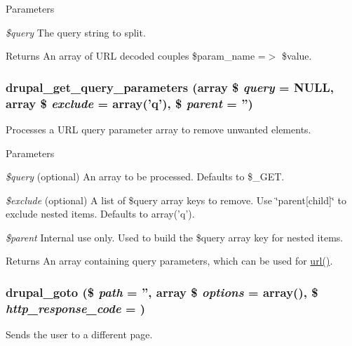 \begin{DoxyParams}{Parameters}
\item[{\em \$query}]The query string to split.\end{DoxyParams}
\begin{DoxyReturn}{Returns}
An array of URL decoded couples \$param\_\-name =$>$ \$value. 
\end{DoxyReturn}
\hypertarget{group__http__handling_ga2e632373cf469e513c0b6b7095f0e4dd}{
\subsubsection[{drupal\_\-get\_\-query\_\-parameters}]{\setlength{\rightskip}{0pt plus 5cm}drupal\_\-get\_\-query\_\-parameters (array \$ {\em query} = {\ttfamily NULL}, \/  array \$ {\em exclude} = {\ttfamily array('q')}, \/  \$ {\em parent} = {\ttfamily ''})}}
\label{group__http__handling_ga2e632373cf469e513c0b6b7095f0e4dd}
Processes a URL query parameter array to remove unwanted elements.


\begin{DoxyParams}{Parameters}
\item[{\em \$query}](optional) An array to be processed. Defaults to \$\_\-GET. \item[{\em \$exclude}](optional) A list of \$query array keys to remove. Use \char`\"{}parent\mbox{[}child\mbox{]}\char`\"{} to exclude nested items. Defaults to array('q'). \item[{\em \$parent}]Internal use only. Used to build the \$query array key for nested items.\end{DoxyParams}
\begin{DoxyReturn}{Returns}
An array containing query parameters, which can be used for \hyperlink{common_8inc_a43b2a0594431556db49df980801d8807}{url()}. 
\end{DoxyReturn}
\hypertarget{group__http__handling_ga5b68d7a934713d1d623b2b32a732235d}{
\subsubsection[{drupal\_\-goto}]{\setlength{\rightskip}{0pt plus 5cm}drupal\_\-goto (\$ {\em path} = {\ttfamily ''}, \/  array \$ {\em options} = {\ttfamily array()}, \/  \$ {\em http\_\-response\_\-code} = {})}}
\label{group__http__handling_ga5b68d7a934713d1d623b2b32a732235d}
Sends the user to a different page.


